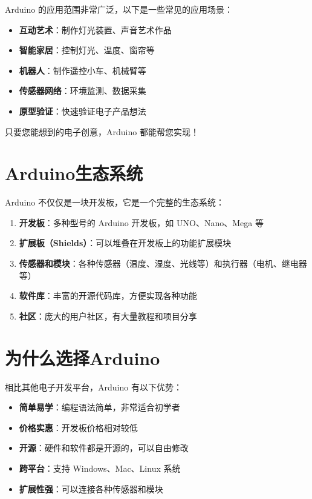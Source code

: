 \documentclass[12pt,UTF8]{ctexbook}
\begin{document}
Arduino 的应用范围非常广泛，以下是一些常见的应用场景：

\begin{itemize}
    \item \textbf{互动艺术}：制作灯光装置、声音艺术作品
    \item \textbf{智能家居}：控制灯光、温度、窗帘等
    \item \textbf{机器人}：制作遥控小车、机械臂等
    \item \textbf{传感器网络}：环境监测、数据采集
    \item \textbf{原型验证}：快速验证电子产品想法
\end{itemize}

只要您能想到的电子创意，Arduino 都能帮您实现！

\section{Arduino生态系统}

Arduino 不仅仅是一块开发板，它是一个完整的生态系统：

\begin{enumerate}
    \item \textbf{开发板}：多种型号的 Arduino 开发板，如 UNO、Nano、Mega 等
    \item \textbf{扩展板（Shields）}：可以堆叠在开发板上的功能扩展模块
    \item \textbf{传感器和模块}：各种传感器（温度、湿度、光线等）和执行器（电机、继电器等）
    \item \textbf{软件库}：丰富的开源代码库，方便实现各种功能
    \item \textbf{社区}：庞大的用户社区，有大量教程和项目分享
\end{enumerate}

\section{为什么选择Arduino}

相比其他电子开发平台，Arduino 有以下优势：

\begin{itemize}
    \item \textbf{简单易学}：编程语法简单，非常适合初学者
    \item \textbf{价格实惠}：开发板价格相对较低
    \item \textbf{开源}：硬件和软件都是开源的，可以自由修改
    \item \textbf{跨平台}：支持 Windows、Mac、Linux 系统
    \item \textbf{扩展性强}：可以连接各种传感器和模块
\end{itemize}
\end{document}
